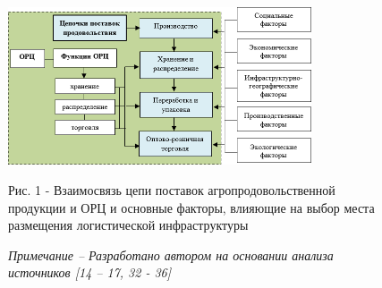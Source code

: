 \begin{figure}[H]
	\centering
	\includegraphics[width=0.8\textwidth]{media/ekon2/image8}
	\caption*{Рис. 1 - Взаимосвязь цепи поставок агропродовольственной продукции и ОРЦ и основные факторы, влияющие на выбор места размещения логистической инфраструктуры}
    \caption*{\normalfont\emph{Примечание -- Разработано автором на основании анализа источников {[}14 -- 17, 32 - 36{]}}}
\end{figure}

